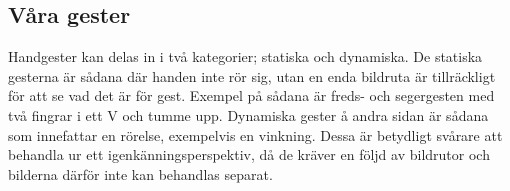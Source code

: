 \documentclass[../rapport_MVEX01-11-05]{subfiles}
\begin{document}
\subsection{Våra gester}
Handgester kan delas in i två kategorier; statiska och dynamiska. De
statiska gesterna är sådana där handen inte rör sig, utan en enda
bildruta är tillräckligt för att se vad det är för gest. Exempel på
sådana är freds- och segergesten med två fingrar i ett V och tumme
upp. Dynamiska gester å andra sidan är sådana som innefattar en
rörelse, exempelvis en vinkning. Dessa är betydligt svårare att
behandla ur ett igenkänningsperspektiv, då de kräver en följd av
bildrutor och bilderna därför inte kan behandlas separat.

\begin{figure}[tb]
	\centering 
\end{figure}
\end{document}
